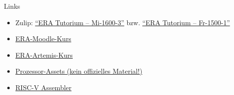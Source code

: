 \begin{frame}[c, fragile]{Links}{}
	\begin{itemize}
		\item Zulip: \href{https://zulip.in.tum.de/#narrow/channel/3255-ERA-Tutorium-.E2.80.93-Mi-1600-3}{\enquote{ERA Tutorium -- Mi-1600-3}}
		      bzw. \href{https://zulip.in.tum.de/#narrow/channel/3264-ERA-Tutorium-.E2.80.93-Fr-1500-1}{\enquote{ERA Tutorium -- Fr-1500-1}}
		\item \href{https://www.moodle.tum.de/course/view.php?id=111440}{ERA-Moodle-Kurs}
		\item \href{https://artemis.tum.de/courses/516}{ERA-Artemis-Kurs}
		\item \href{https://courses.edx.org/assets/courseware/v1/f06a2dc0c856f60ec0711e9f5e1c98cf/asset-v1:HarveyMuddX+ENGR85B+1T2023+type@asset+block/FinalReferences.pdf}{Prozessor-Assets (kein offizielles Material!)}
		\item \href{https://riscvasm.lucasteske.dev/}{RISC-V Assembler}
	\end{itemize}
\end{frame}

\maketitle


